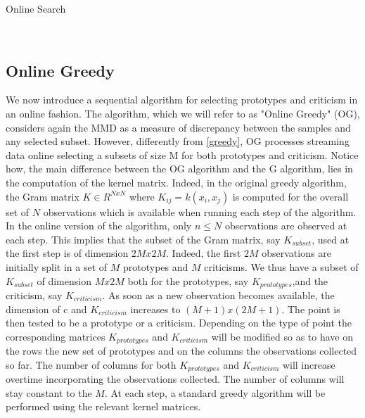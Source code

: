 \documentclass{article}
\begin{document}
	\begin{algorithm}
		\caption{Online Search}\label{online_greedy}
		\begin{algorithmic}[1]
			\EndIf
			\EndFor\\
			
		\end{algorithmic}
	\end{algorithm}
	
	\subsection{Online Greedy}
	We now introduce a sequential algorithm for selecting prototypes and criticism in an online fashion. The algorithm, which we will refer to as "Online Greedy" (OG), considers again the MMD as a measure of discrepancy between the samples and any selected subset. However, differently from \ref{greedy}, OG processes streaming data online selecting a subsets of size M for both prototypes and criticism.  Notice how, the main difference between the OG algorithm and the G algorithm, lies in the computation of the kernel matrix. Indeed, in the original greedy algorithm, the Gram matrix $K \in R^{NxN}$ where $K_{ij}=k(x_i,x_j)$ is computed for the overall set of $N$ observations which is available when running each step of the algorithm. In the online version of the algorithm, only $n \leq N$ observations are observed at each step. This implies that the subset of the Gram matrix, say $K_{subset}$, used at the first step is of dimension $2Mx2M$. Indeed, the first $2M$ observations are initially split in a set of $M$ prototypes and $M$ criticisms. We thus have a subset of $K_{subset}$ of dimension $Mx2M$ both for the prototypes, say $K_{prototypes}$,and the criticism, say $K_{criticism}$. As soon as a new observation becomes available, the dimension of c and $K_{criticism}$ increases to $(M+1)x(2M+1)$. The point is then tested to be a prototype or a criticism. Depending on the type of point the corresponding matrices $K_{prototypes}$ and $K_{criticism}$ will be modified so as to have on the rows the new set of prototypes and on the columns the observations collected so far. The number of columns for both $K_{prototypes}$ and $K_{criticism}$ will increase overtime incorporating the observations collected. The number of columns will stay constant to the $M$. At each step, a standard greedy algorithm will be performed using the relevant kernel matrices.  
	
\end{document}
